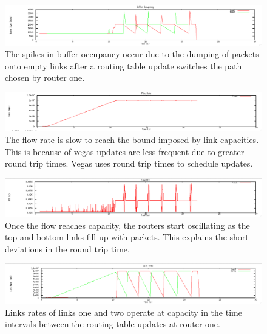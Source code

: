 \documentclass[12pt]{article}
\begin{document}
\newpage


\begin{figure}[!ht]
\centering \includegraphics[bb= 0 0 1300 250, scale=.35]{figures/Test1_Vegas/buffer_occ.png}
\caption{The spikes in buffer occupancy occur due to the dumping of packets onto empty links after a routing table update switches the path chosen by router one.}
\label{fig:test1_vegas_buffer_occ}
\end{figure}

\begin{figure}[!ht]
\centering \includegraphics[bb= 0 0 1300 250, scale=.35]{figures/Test1_Vegas/flow_rate.png}
\caption{The flow rate is slow to reach the bound imposed by link capacities. This is because of vegas updates are less frequent due to greater round trip times. Vegas uses round trip times to schedule updates.}
\label{fig:test1_vegas_flow_rate}
\end{figure}

\begin{figure}[!ht]
\centering \includegraphics[bb= 0 0 1300 250, scale=.35]{figures/Test1_Vegas/flow_rtt.png}
\caption{Once the flow reaches capacity, the routers start oscillating as the top and bottom links fill up with packets. This explains the short deviations in the round trip time.}
\label{fig:test1_vegas_flow_rtt}
\end{figure}

\begin{figure}[!ht]
\centering \includegraphics[bb= 0 0 1300 250, scale=.35]{figures/Test1_Vegas/link_rate.png}
\caption{Links rates of links one and two operate at capacity in the time intervals between the routing table updates at router one.}
\label{fig:test1_vegas_link_rate}
\end{figure}
\end{document}
